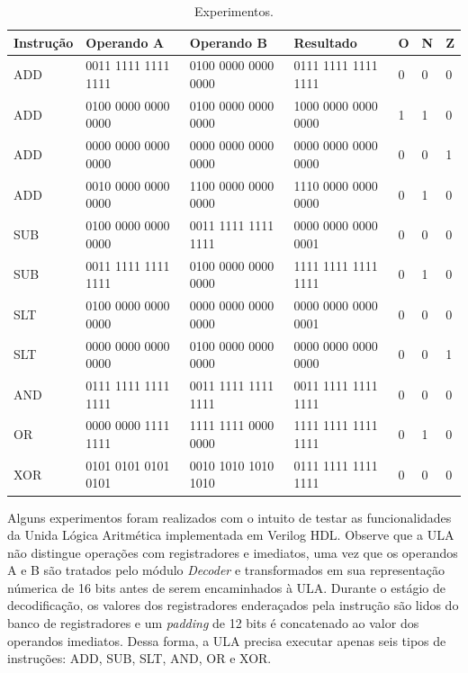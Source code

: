 \documentclass[11pt,a4paper,titlepage]{article}
\begin{document}
\begin{table}[t]
\centering
\begin{tabular}{|l|l|l|l|l|l|l|}
\hline
Instrução & Operando A & Operando B & Resultado & O & N & Z \\
\hline
ADD & 0011 1111 1111 1111 & 0100 0000 0000 0000 & 0111 1111 1111 1111 & 0 & 0 & 0 \\
ADD & 0100 0000 0000 0000 & 0100 0000 0000 0000 & 1000 0000 0000 0000 & 1 & 1 & 0 \\
ADD & 0000 0000 0000 0000 & 0000 0000 0000 0000 & 0000 0000 0000 0000 & 0 & 0 & 1 \\
ADD & 0010 0000 0000 0000 & 1100 0000 0000 0000 & 1110 0000 0000 0000 & 0 & 1 & 0 \\
SUB & 0100 0000 0000 0000 & 0011 1111 1111 1111 & 0000 0000 0000 0001 & 0 & 0 & 0 \\
SUB & 0011 1111 1111 1111 & 0100 0000 0000 0000 & 1111 1111 1111 1111 & 0 & 1 & 0 \\
SLT & 0100 0000 0000 0000 & 0000 0000 0000 0000 & 0000 0000 0000 0001 & 0 & 0 & 0 \\
SLT & 0000 0000 0000 0000 & 0100 0000 0000 0000 & 0000 0000 0000 0000 & 0 & 0 & 1 \\
AND & 0111 1111 1111 1111 & 0011 1111 1111 1111 & 0011 1111 1111 1111 & 0 & 0 & 0 \\
OR  & 0000 0000 1111 1111 & 1111 1111 0000 0000 & 1111 1111 1111 1111 & 0 & 1 & 0 \\
XOR & 0101 0101 0101 0101 & 0010 1010 1010 1010 & 0111 1111 1111 1111 & 0 & 0 & 0 \\
\hline

\end{tabular}
\caption{Experimentos.}
\label{tab:experiments}
\end{table}
%

Alguns experimentos foram realizados com o intuito de testar as funcionalidades da Unida Lógica Aritmética
implementada em Verilog HDL. Observe que a ULA não distingue operações com registradores e imediatos, uma 
vez que os operandos A e B são tratados pelo módulo \textit{Decoder} e transformados em sua representação 
númerica de 16 bits antes de serem encaminhados à ULA. Durante o estágio de decodificação, os valores dos 
registradores enderaçados pela instrução são lidos do banco de registradores e um \textit{padding} de 12 
bits é concatenado ao valor dos operandos imediatos. Dessa forma, a ULA precisa executar apenas seis tipos 
de instruções: ADD, SUB, SLT, AND, OR e XOR. 
\end{document}
